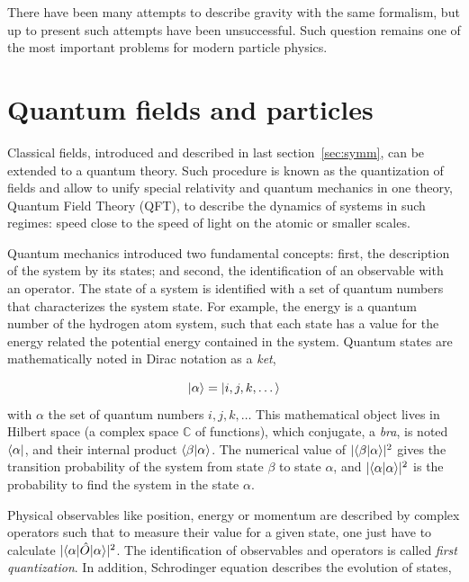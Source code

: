 There have been many attempts to describe gravity with the same formalism, but up to present such attempts have been unsuccessful. Such question remains one of the most important problems for modern particle physics.  

\section{Quantum fields and particles}
\label{sec:fields}

Classical fields, introduced and described in last section~\ref{sec:symm}, can be extended to a quantum theory. Such procedure is known as the quantization of fields and allow to unify special relativity and quantum mechanics in one theory, Quantum Field Theory (QFT), to describe the dynamics of systems in such regimes: speed close to the speed of light on the atomic or smaller scales.

Quantum mechanics introduced two fundamental concepts: first, the description of the system by its states; and second, the identification of an observable with an operator. The state of a system is identified with a set of quantum numbers that characterizes the system state. For example, the energy is a quantum number of the hydrogen atom system, such that each state has a value for the energy related the potential energy contained in the system. Quantum states are mathematically noted in Dirac notation as a \textit{ket},

\begin{equation}
  \label{eq:DiracNot}
  | \alpha\rangle=| i,j,k,\dots\rangle
\end{equation}with $\alpha$ the set of quantum numbers $i,j,k,\dots$ This mathematical object lives in Hilbert space (a complex space $\mathds{C}$ of functions), which conjugate, a \textit{bra}, is noted $\langle \alpha |$, and their internal product $\langle \beta | \alpha\rangle$. The numerical value of $|\langle \beta | \alpha\rangle|^{2}$ gives the transition probability of the system from state $\beta$ to state $\alpha$, and $|\langle \alpha | \alpha\rangle|^{2}$ is the probability to find the system in the state $\alpha$.

Physical observables like position, energy or momentum are described by complex operators such that to measure their value for a given state, one just have to calculate $|\langle \alpha |\hat{O}| \alpha\rangle|^{2}$. The identification of observables and operators is called \textit{first quantization}. In addition, Schrodinger equation describes the evolution of states,

